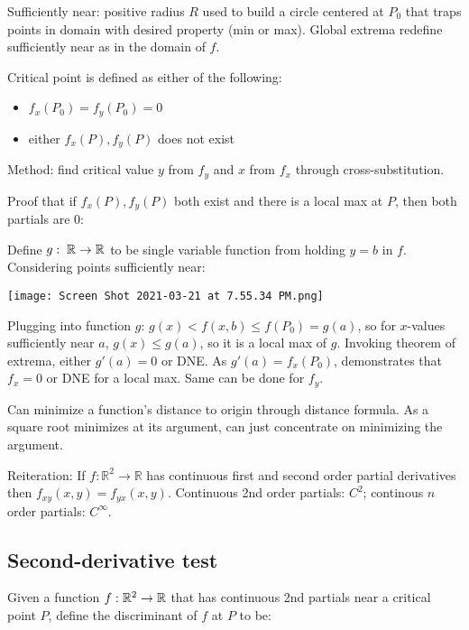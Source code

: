 Sufficiently near: positive radius $R$ used to build a circle centered at $P_0$ that traps points in domain with desired property (min or max).
Global extrema redefine sufficiently near as in the domain of $f$.

\par 
Critical point is defined as either of the following:
\begin{itemize}
    \item $f_x(P_0)=f_y(P_0)=0$
    \item either $f_x(P),f_y(P)$ does not exist
\end{itemize}

Method: find critical value $y$ from $f_y$ and $x$ from $f_x$ through cross-substitution.

\par
Proof that if $f_x(P),f_y(P)$ both exist and there is a local max at $P$, then both partials are 0:

\par
Define $g:\;\mathbb{R}\rightarrow \mathbb{R}$ to be single variable function from holding $y=b$ in $f$. Considering points sufficiently near:

\texttt{[image: Screen Shot 2021-03-21 at 7.55.34 PM.png]}

Plugging into function $g$: $g(x) < f(x,b) \leq f(P_0)=g(a)$, so for $x$-values sufficiently
near $a$, $g(x)\leq g(a)$, so it is a local max of $g$. Invoking theorem of extrema, either $g'(a)=0$ or DNE. As $g'(a)=f_x(P_0)$, demonstrates that
$f_x=0$ or DNE for a local max. Same can be done for $f_y$.

\par
Can minimize a function's distance to origin through distance formula. As a square root minimizes
at its argument, can just concentrate on minimizing the argument.

\par
Reiteration: If $f: \mathbb{R}^{2} \rightarrow \mathbb{R}$ has continuous first and second order partial derivatives then $f_{x y}(x, y)=f_{y x}(x, y)$.
Continuous 2nd order partials: $C^2$; continous $n$ order partials: $C^\infty$.

\subsection{Second-derivative test}

Given a function $f:\mathbb{R}^2 \rightarrow \mathbb{R}$ that has continuous 2nd partials near a critical point $P$, define
the discriminant of $f$ at $P$ to be:

